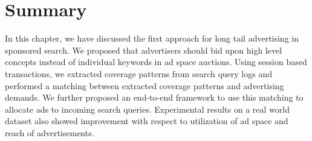 \section{Summary}
\label{ch4Summary}
In this chapter, we have discussed the first approach for long tail advertising in sponsored search. We proposed that advertisers should bid upon high level concepts instead of individual keywords in ad space auctions. Using session based transactions, we extracted coverage patterns from search query logs and performed a matching between extracted coverage patterns and advertising demands. We further proposed an end-to-end framework to use this matching to allocate ads to incoming search queries. Experimental results on a real world dataset also showed improvement with respect to utilization of ad space and reach of advertisements. 


